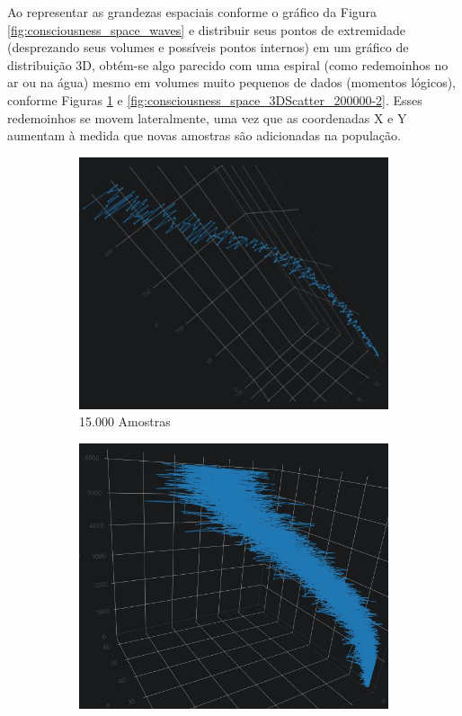 Ao representar as grandezas espaciais conforme o gráfico da Figura \ref{fig:consciousness_space_waves} e distribuir seus pontos de extremidade (desprezando seus volumes e possíveis pontos internos) em um gráfico de distribuição 3D, obtém-se algo parecido com uma espiral (como redemoinhos no ar ou na água) mesmo em volumes muito pequenos de dados (momentos lógicos), conforme Figuras \ref{fig:consciousness_space_3DScatter15000-10} e \ref{fig:consciousness_space_3DScatter_200000-2}. Esses redemoinhos se movem lateralmente, uma vez que as coordenadas X e Y aumentam à medida que novas amostras são adicionadas na população. 
	\begin{figure}[H]
	\centering
		\begin{subfigure}[H]{0.47\linewidth}
		\centering
		\includegraphics[width=.96\linewidth]{sections/images/consciousness_space_3DScatter15000-10.jpg}
		\caption{15.000 Amostras}
		\label{fig:consciousness_space_3DScatter15000-10}
		\end{subfigure}
	\hfill
		\begin{subfigure}[H]{0.47\linewidth}
		\centering
		\includegraphics[width=.9\linewidth]{sections/images/consciousness_space_3DScatter_200000-2.jpg}

\end{subfigure}
\end{figure}
